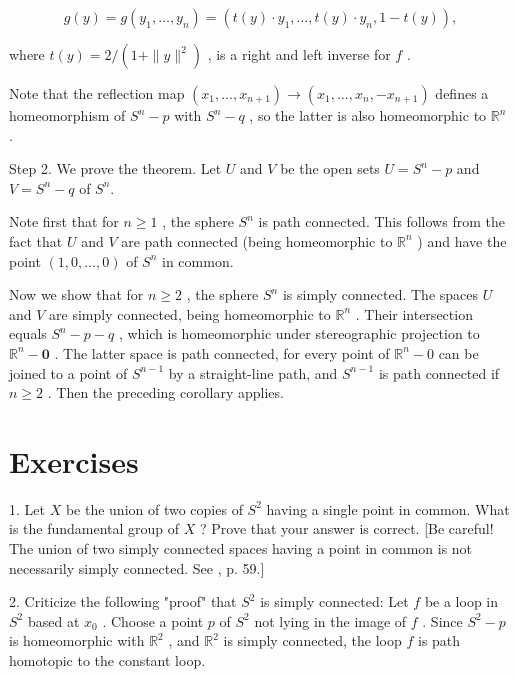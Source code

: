 \[
g\left( y\right)  = g\left( {{y}_{1},\ldots ,{y}_{n}}\right)  = \left( {t\left( y\right)  \cdot  {y}_{1},\ldots ,t\left( y\right)  \cdot  {y}_{n},1 - t\left( y\right) }\right) ,
\]

where \(t\left( y\right)  = 2/\left( {1 + \parallel y{\parallel }^{2}}\right)\) , is a right and left inverse for \(f\) .

Note that the reflection map \(\left( {{x}_{1},\ldots ,{x}_{n + 1}}\right)  \rightarrow  \left( {{x}_{1},\ldots ,{x}_{n}, - {x}_{n + 1}}\right)\) defines a homeomorphism of \({S}^{n} - p\) with \({S}^{n} - q\) , so the latter is also homeomorphic to \({\mathbb{R}}^{n}\) .

Step 2. We prove the theorem. Let \(U\) and \(V\) be the open sets \(U = {S}^{n} - p\) and \(V = {S}^{n} - q\) of \({S}^{n}.\)

Note first that for \(n \geq  1\) , the sphere \({S}^{n}\) is path connected. This follows from the fact that \(U\) and \(V\) are path connected (being homeomorphic to \({\mathbb{R}}^{n}\) ) and have the point \(\left( {1,0,\ldots ,0}\right)\) of \({S}^{n}\) in common.

Now we show that for \(n \geq  2\) , the sphere \({S}^{n}\) is simply connected. The spaces \(U\) and \(V\) are simply connected, being homeomorphic to \({\mathbb{R}}^{n}\) . Their intersection equals \({S}^{n} - p - q\) , which is homeomorphic under stereographic projection to \({\mathbb{R}}^{n} - \mathbf{0}\) . The latter space is path connected, for every point of \({\mathbb{R}}^{n} - 0\) can be joined to a point of \({S}^{n - 1}\) by a straight-line path, and \({S}^{n - 1}\) is path connected if \(n \geq  2\) . Then the preceding corollary applies.

\section*{Exercises}

1. Let \(X\) be the union of two copies of \({S}^{2}\) having a single point in common. What is the fundamental group of \(X\) ? Prove that your answer is correct. [Be careful! The union of two simply connected spaces having a point in common is not necessarily simply connected. See 		\cite{Spanier1966}, p. 59.]

2. Criticize the following "proof" that \({S}^{2}\) is simply connected: Let \(f\) be a loop in \({S}^{2}\) based at \({x}_{0}\) . Choose a point \(p\) of \({S}^{2}\) not lying in the image of \(f\) . Since \({S}^{2} - p\) is homeomorphic with \({\mathbb{R}}^{2}\) , and \({\mathbb{R}}^{2}\) is simply connected, the loop \(f\) is path homotopic to the constant loop.

